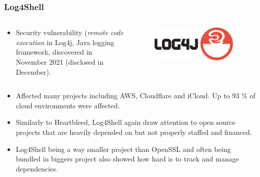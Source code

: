 \documentclass[aspectratio=169]{beamer}              %
\begin{document}
\begin{frame}
	\frametitle{Log4Shell}
	
\begin{columns}
\begin{column}{0.68\textwidth}

		\begin{itemize}
			\item Security vulnerability (\emph{remote code execution} in Log4j, Java logging framework, discovered in November 2021 (disclosed in December). \footnotemark~\footnotemark
		\end{itemize}
\end{column}

\begin{column}{0.25\textwidth}
	\begin{figure}[ht!]
	\begin{center}
  	  \includegraphics[width=0.95\textwidth]{img/log4j.png}
	\end{center}
	\end{figure}
\end{column}
\end{columns}

		\begin{itemize}
			\item Affected many projects including AWS, Cloudflare and iCloud. Up to 93 \% of cloud environments were affected.
			\item Similarly to Heartbleed, Log4Shell again draw attention to open source projects that are heavily depended on but not properly staffed and financed.\footnotemark
			\item Log4Shell being a way smaller project than OpenSSL and often being bundled in biggers project also showed how hard is to track and manage dependencies.
		\end{itemize}


\end{frame}
\end{document}
